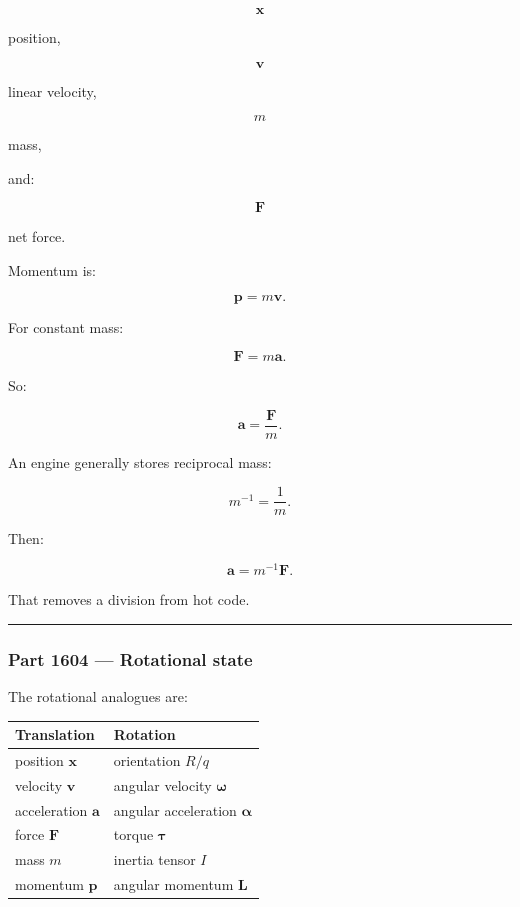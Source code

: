 \[
\mathbf{x}
\]

position,

\[
\mathbf{v}
\]

linear velocity,

\[
m
\]

mass,

and:

\[
\mathbf{F}
\]

net force.

Momentum is:

\[
\mathbf{p}=m\mathbf{v}.
\]

For constant mass:

\[
\mathbf{F}=m\mathbf{a}.
\]

So:

\[
\mathbf{a}
=
\frac{\mathbf{F}}{m}.
\]

An engine generally stores reciprocal mass:

\[
m^{-1}
=
\frac{1}{m}.
\]

Then:

\[
\mathbf{a}
=
m^{-1}\mathbf{F}.
\]

That removes a division from hot code.

\begin{center}\rule{0.5\linewidth}{0.5pt}\end{center}

\subsubsection{Part 1604 --- Rotational state}\label{part-1604-rotational-state}

The rotational analogues are:

{\def\LTcaptype{none} %
\begin{longtable}[]{@{}
  >{\raggedright\arraybackslash}p{}
  >{\raggedright\arraybackslash}p{}@{}}
\toprule\noalign{}
\begin{minipage}[b]{\linewidth}\raggedright
Translation
\end{minipage} & \begin{minipage}[b]{\linewidth}\raggedright
Rotation
\end{minipage} \\
\midrule\noalign{}
\endhead
\bottomrule\noalign{}
\endlastfoot
position \(\mathbf{x}\) & orientation \(R/q\) \\
velocity \(\mathbf{v}\) & angular velocity \(\boldsymbol{\omega}\) \\
acceleration \(\mathbf{a}\) & angular acceleration \(\boldsymbol{\alpha}\) \\
force \(\mathbf{F}\) & torque \(\boldsymbol{\tau}\) \\
mass \(m\) & inertia tensor \(I\) \\
momentum \(\mathbf{p}\) & angular momentum \(\mathbf{L}\) \\
\end{longtable}
}

